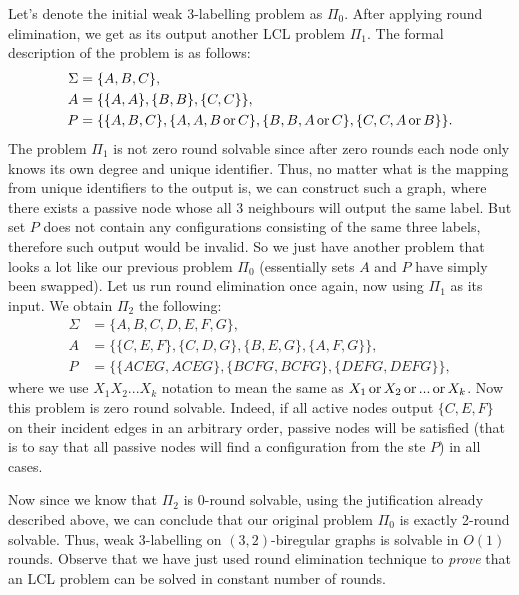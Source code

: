 Let's denote the initial weak 3-labelling problem as $\Pi_0$. After applying round elimination, we get as its
output another LCL problem $\Pi_1$. The formal description of the problem is as follows:
\begin{align*}
\Sigma &= \{A, B, C\}, \\
A &= \{ \{A, A\}, \{B, B\}, \{C, C\}\}, \\
P &= \{ \{A, B ,C\}, \{A, A, B \operatorname{or} C\}, \{B, B, A \operatorname{or} C\}, \{C, C, A \operatorname{or} B\} \}.
\end{align*}
The problem $\Pi_1$ is not zero round solvable since after zero rounds each node only
knows its own degree and unique identifier. Thus, no matter what is the mapping from
unique identifiers to the output is, we can construct such a graph, where there exists
a passive node whose all 3 neighbours will output the same label. But set $P$ does not
contain any configurations consisting of the same three labels, therefore such
output would be invalid. So we just have another problem that looks a lot like our
previous problem $\Pi_0$ (essentially sets $A$ and $P$ have simply been swapped).
Let us run round elimination once again, now using $\Pi_1$ as its input. We obtain
$\Pi_2$ the following:
\begin{align*}
\Sigma &= \{A, B, C, D, E, F, G\}, \\
A &= \{ \{C, E, F\}, \{C, D, G\}, \{B, E, G\}, \{A, F, G\}\}, \\
P &= \{ \{ACEG, ACEG\}, \{BCFG, BCFG\}, \{DEFG, DEFG\} \},
\end{align*}
where we use $X_1X_2...X_k$ notation to mean the same as $X_1 \operatorname{or} X_2 \operatorname{or} ... \operatorname{or} X_k$.
Now this problem is zero round solvable. Indeed, if all active nodes output $\{C, E, F\}$
on their incident edges in an arbitrary order, passive nodes will be satisfied (that is to say
that all passive nodes will find a configuration from the ste $P$) in all cases.

Now since we know that $\Pi_2$ is 0-round solvable, using the jutification already described
above, we can conclude that our original problem $\Pi_0$ is exactly 2-round solvable. Thus,
weak 3-labelling on $(3, 2)$-biregular graphs is solvable in $O(1)$ rounds. Observe that
we have just used round elimination technique to \emph{prove} that an LCL problem can be
solved in constant number of rounds.


